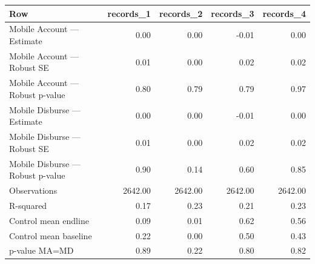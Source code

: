 
\begin{tabular}{lrrrr}
\toprule
Row & records\_1 & records\_2 & records\_3 & records\_4\\
\midrule
Mobile Account — Estimate & 0.00 & 0.00 & -0.01 & 0.00\\
Mobile Account — Robust SE & 0.01 & 0.00 & 0.02 & 0.02\\
Mobile Account — Robust p-value & 0.80 & 0.79 & 0.79 & 0.97\\
Mobile Disburse — Estimate & 0.00 & 0.00 & -0.01 & 0.00\\
Mobile Disburse — Robust SE & 0.01 & 0.00 & 0.02 & 0.02\\
\addlinespace
Mobile Disburse — Robust p-value & 0.90 & 0.14 & 0.60 & 0.85\\
Observations & 2642.00 & 2642.00 & 2642.00 & 2642.00\\
R-squared & 0.17 & 0.23 & 0.21 & 0.23\\
Control mean endline & 0.09 & 0.01 & 0.62 & 0.56\\
Control mean baseline & 0.22 & 0.00 & 0.50 & 0.43\\
\addlinespace
p-value MA=MD & 0.89 & 0.22 & 0.80 & 0.82\\
\bottomrule
\end{tabular}
